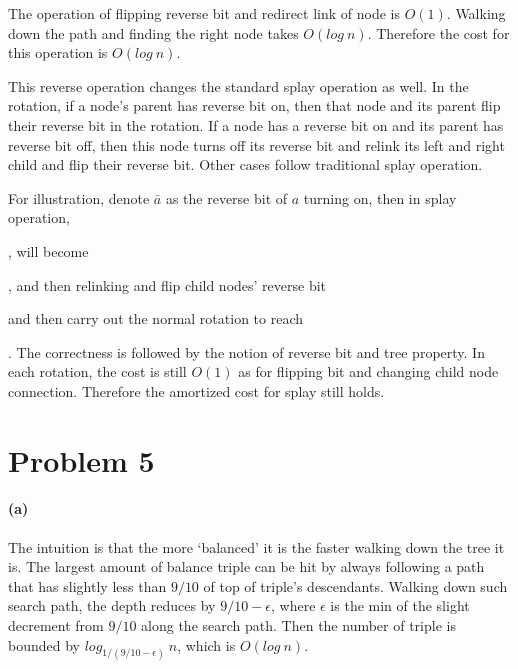 \documentclass[10pt,letter]{article}
\begin{document}
The operation of flipping reverse bit and redirect link of node is $O(1)$. Walking down the path and finding the right node takes $O(log \:n)$. Therefore the cost for this operation is $O(log\:n)$.

This reverse operation changes the standard splay operation as well. In the rotation, if a node's parent has reverse bit on, then that node and its parent flip their reverse bit in the rotation. If a node has a reverse bit on and its parent has reverse bit off, then this node turns off its reverse bit and relink its left and right child and flip their reverse bit. Other cases follow traditional splay operation. 

For illustration, denote $\bar{a}$ as the reverse bit of $a$ turning on, then in splay operation, , will become , and then relinking and flip child nodes' reverse bit  and then carry out the normal rotation to reach . The correctness is followed by the notion of reverse bit and tree property. In each rotation, the cost is still $O(1)$ as for flipping bit and changing child node connection. Therefore the amortized cost for splay still holds.

\section*{Problem 5}
\paragraph{(a)} The intuition is that the more `balanced' it is the faster walking down the tree it is. The largest amount of balance triple can be hit by always following a path that has slightly less than $9/10$ of top of triple's descendants. Walking down such search path, the depth reduces by $9/10 -\epsilon$, where $\epsilon$ is the min of the slight decrement from $9/10$ along the search path. Then the number of triple is bounded by $log_{1/(9/10 - \epsilon)}\: n$, which is $O(log\:n)$.
\end{document}
